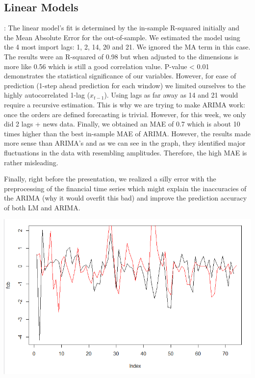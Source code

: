 \documentclass{article}
\begin{document}
	\subsection{Linear Models}:
	The linear model's fit is determined by the in-sample R-squared initially and the Mean Absolute Error for the out-of-sample.
	We estimated the model using the 4 most import lags: 1, 2, 14, 20 and 21. We ignored the MA term in this case.
	The results were an R-squared of 0.98 but when adjusted to the dimensions is more like 0.56 which is still a good correlation value. P-value < 0.01 demonstrates the statistical significance of our variables.
	However, for ease of prediction (1-step ahead prediction for each window) we limited ourselves to the highly autocorrelated 1-lag ($x_{t-1}$). Using lags as far away as 14 and 21 would require a recursive estimation. This is why we are trying to make ARIMA work: once the orders are defined forecasting is trivial. However, for this week, we only did 2 lags + news data.
	Finally, we obtained an MAE of 0.7 which is about 10 times higher than the best in-sample MAE of ARIMA. However, the results made more sense than ARIMA's and as we can see in the graph, they identified major fluctuations in the data with resembling amplitudes. Therefore, the high MAE is rather misleading.
	
	Finally, right before the presentation, we realized a silly error with the preprocessing of the financial time series which might explain the inaccuracies of the ARIMA (why it would overfit this bad) and improve the prediction accuracy of both LM and ARIMA.

\begin{center}
\includegraphics[scale=0.7]{../Pred820.PNG}
\end{center}
\end{document}

